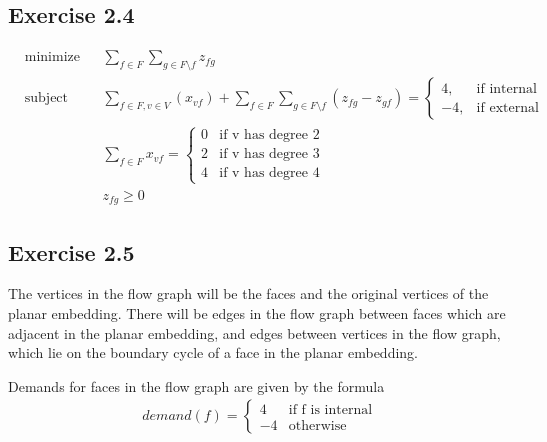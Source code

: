 \documentclass[12pt]{article}
\begin{document}
\subsection*{Exercise 2.4}

  \begin{equation*}
    \begin{aligned}
    & {\text{minimize}}
    & & \sum_{f \in F}\sum_{g \in F \setminus f} z_{fg} \\
    & \text{subject to}
    & & \sum_{f \in F, v \in V}(x_{vf}) + \sum_{f \in F}\sum_{g \in F \setminus f}(z_{fg} - z_{gf}) = \begin{cases}
                                                                                      4, & \text{if internal}\\
                                                                                      -4, & \text{if external}
                                                                                     \end{cases} \\
    & & &  \sum_{f \in F}{x_{vf}} = \begin{cases}
                                        0 & \text{if v has degree 2}\\
                                        2 & \text{if v has degree 3}\\
                                        4 & \text{if v has degree 4}
                                    \end{cases}\\
    & & & z_{fg} \geq 0
    \end{aligned}
  \end{equation*}

\subsection*{Exercise 2.5}

The vertices in the flow graph will be the faces and the original vertices of the planar embedding. There will be edges in the flow graph between faces which are adjacent in the planar embedding, and edges between vertices in the flow graph, which lie on the boundary cycle of a face in the planar embedding.

Demands for faces in the flow graph are given by the formula
\begin{align*}
    demand(f) = \begin{cases} 4 & \text {if f is internal}\\ -4 &\text{otherwise}\end{cases}
\end{align*}
\end{document}
